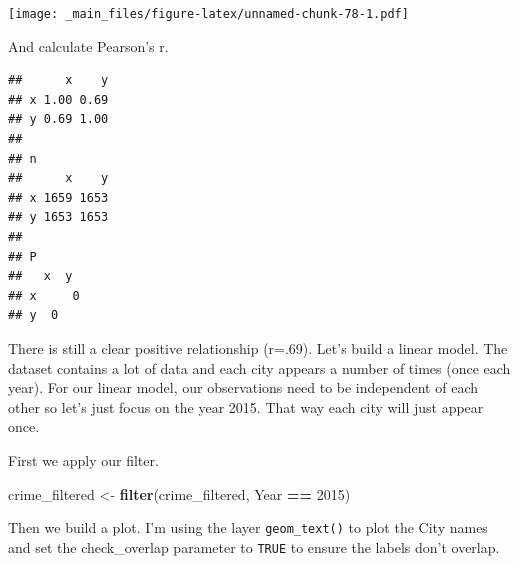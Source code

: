 \documentclass[
]{book}
\newenvironment{Shaded}{\begin{snugshade}}{\end{snugshade}}
\newcommand{\DecValTok}[1]{\textcolor[rgb]{0.00,0.00,0.81}{#1}}
\newcommand{\FunctionTok}[1]{\textcolor[rgb]{0.13,0.29,0.53}{\textbf{#1}}}
\newcommand{\NormalTok}[1]{#1}
\newcommand{\OtherTok}[1]{\textcolor[rgb]{0.56,0.35,0.01}{#1}}
\newcommand{\SpecialCharTok}[1]{\textcolor[rgb]{0.81,0.36,0.00}{\textbf{#1}}}
\begin{document}
\texttt{[image: \_main\_files/figure-latex/unnamed-chunk-78-1.pdf]}

And calculate Pearson's r.

\begin{Shaded}
\end{Shaded}

\begin{verbatim}
##      x    y
## x 1.00 0.69
## y 0.69 1.00
## 
## n
##      x    y
## x 1659 1653
## y 1653 1653
## 
## P
##   x  y 
## x     0
## y  0
\end{verbatim}

There is still a clear positive relationship (r=.69). Let's build a linear model. The dataset contains a lot of data and each city appears a number of times (once each year). For our linear model, our observations need to be independent of each other so let's just focus on the year 2015. That way each city will just appear once.

First we apply our filter.

\begin{Shaded}
\begin{Highlighting}[]
\NormalTok{crime\_filtered }\OtherTok{\textless{}{-}} \FunctionTok{filter}\NormalTok{(crime\_filtered, Year }\SpecialCharTok{==} \DecValTok{2015}\NormalTok{)}
\end{Highlighting}
\end{Shaded}

Then we build a plot. I'm using the layer \texttt{geom\_text()} to plot the City names and set the check\_overlap parameter to \texttt{TRUE} to ensure the labels don't overlap.
\end{document}
